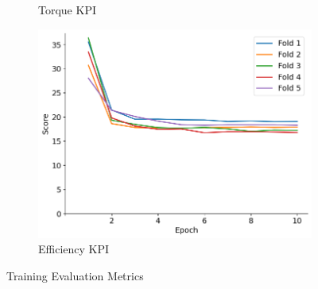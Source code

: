 \documentclass{report} %
\begin{document}
\begin{figure}[H]
\begin{subfigure}{0.32\textwidth}
        \caption{\centering Torque \ac{KPI}}
        \label{fig:Training Score for Torque Curve}
    \end{subfigure}\hfill
    \begin{subfigure}{0.32\textwidth}
        \centering
        \includegraphics[width=\textwidth]{./ReportImages/train_score_y2.png}
        \caption{\centering Efficiency \ac{KPI}}
        \label{fig:Training Score for Efficiency grid}
    \end{subfigure}
    \caption{Training Evaluation Metrics}
    \label{fig:Training Evaluation Metrics}
\end{figure}
\end{document}
